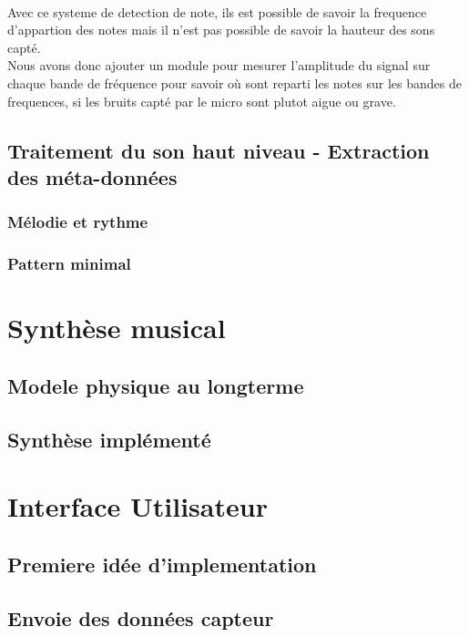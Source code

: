 \documentclass[a4paper, titlepage, oneside, 12pt]{article}%
\begin{document}
\paragraph{}
Avec ce systeme de detection de note, ils est possible de savoir la frequence d'appartion des notes mais il n'est pas possible de savoir la hauteur des sons capté.\\
Nous avons donc ajouter un module pour mesurer l'amplitude du signal sur chaque bande de fréquence pour savoir où sont reparti les notes sur les bandes de frequences, si les bruits capté par le micro sont plutot aigue ou grave.

\subsection{Traitement du son haut niveau - Extraction des méta-données}
\subsubsection{Mélodie et rythme}
\subsubsection{Pattern minimal}


\newpage
\section{Synthèse musical}
\subsection{Modele physique au longterme}

\subsection{Synthèse implémenté}

\newpage
\section{Interface Utilisateur}
\subsection{Premiere idée d'implementation}

\subsection{Envoie des données capteur}
\end{document}
